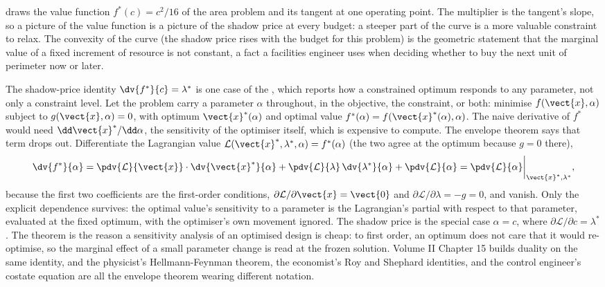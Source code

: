 

 draws the value function
$f^{*}(c) = c^{2}/16$ of the area problem and its tangent at one
operating point. The multiplier is the tangent's slope, so a picture of
the value function is a picture of the shadow price at every budget: a
steeper part of the curve is a more valuable constraint to relax. The
convexity of the curve (the shadow price rises with the budget for this
problem) is the geometric statement that the marginal value of a fixed
increment of resource is not constant, a fact a facilities engineer uses
when deciding whether to buy the next unit of perimeter now or later.

\begin{mastery}
The shadow-price identity $\dv{f^{*}}{c} = \lambda^{*}$ is one case
of the , which reports how a constrained
optimum responds to any parameter, not only a constraint level. Let
the problem carry a parameter $\alpha$ throughout, in the objective,
the constraint, or both: minimise $f(\vect{x}, \alpha)$ subject to
$g(\vect{x}, \alpha) = 0$, with optimum $\vect{x}^{*}(\alpha)$ and
optimal value $f^{*}(\alpha) = f(\vect{x}^{*}(\alpha), \alpha)$. The
naive derivative of $f^{*}$ would need $\dd\vect{x}^{*}/\dd\alpha$,
the sensitivity of the optimiser itself, which is expensive to
compute. The envelope theorem says that term drops out. Differentiate
the Lagrangian value $\mathcal{L}(\vect{x}^{*}, \lambda^{*}, \alpha)
= f^{*}(\alpha)$ (the two agree at the optimum because $g = 0$ there),
\[
\dv{f^{*}}{\alpha} = \pdv{\mathcal{L}}{\vect{x}}\cdot
\dv{\vect{x}^{*}}{\alpha} + \pdv{\mathcal{L}}{\lambda}\,
\dv{\lambda^{*}}{\alpha} + \pdv{\mathcal{L}}{\alpha}
= \pdv{\mathcal{L}}{\alpha}\bigg|_{\vect{x}^{*}, \lambda^{*}},
\]
because the first two coefficients are the first-order conditions,
$\partial\mathcal{L}/\partial\vect{x} = \vect{0}$ and
$\partial\mathcal{L}/\partial\lambda = -g = 0$, and vanish. Only the
explicit dependence survives: the optimal value's sensitivity to a
parameter is the Lagrangian's partial with respect to that parameter,
evaluated at the fixed optimum, with the optimiser's own movement
ignored. The shadow price is the special case $\alpha = c$, where
$\partial\mathcal{L}/\partial c = \lambda^{*}$. The theorem is the
reason a sensitivity analysis of an optimised design is cheap: to
first order, an optimum does not care that it would re-optimise, so
the marginal effect of a small parameter change is read at the frozen
solution. Volume II Chapter 15 builds duality on the same identity,
and the physicist's Hellmann-Feynman theorem, the economist's Roy and
Shephard identities, and the control engineer's costate equation are
all the envelope theorem wearing different notation.
\end{mastery}

